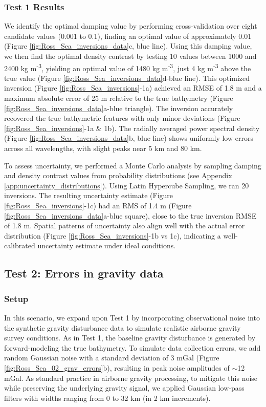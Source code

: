 \documentclass[tc, manuscript]{copernicus}
\begin{document}
\subsubsection{Test 1 Results}
We identify the optimal damping value by performing cross-validation over eight candidate values (0.001 to 0.1), finding an optimal value of approximately 0.01 (Figure \ref{fig:Ross_Sea_inversions_data}c, blue line). Using this damping value, we then find the optimal density contrast by testing 10 values between 1000 and 2400 kg m\textsuperscript{-3}, yielding an optimal value of 1480 kg m\textsuperscript{-3}, just 4 kg m\textsuperscript{-3} above the true value (Figure \ref{fig:Ross_Sea_inversions_data}d-blue line). This optimized inversion (Figure \ref{fig:Ross_Sea_inversions}-1a) achieved an RMSE of 1.8 m and a maximum absolute error of 25 m relative to the true bathymetry (Figure \ref{fig:Ross_Sea_inversions_data}a-blue triangle). The inversion accurately recovered the true bathymetric features with only minor deviations (Figure \ref{fig:Ross_Sea_inversions}-1a \& 1b). The radially averaged power spectral density (Figure \ref{fig:Ross_Sea_inversions_data}b, blue line) shows uniformly low errors across all wavelengths, with slight peaks near 5 km and 80 km.

To assess uncertainty, we performed a Monte Carlo analysis by sampling damping and density contrast values from probability distributions (see Appendix \ref{app:uncertainty_distributions}). Using Latin Hypercube Sampling, we ran 20 inversions. The resulting uncertainty estimate (Figure \ref{fig:Ross_Sea_inversions}-1c) had an RMS of 1.4 m (Figure \ref{fig:Ross_Sea_inversions_data}a-blue square), close to the true inversion RMSE of 1.8 m. Spatial patterns of uncertainty also align well with the actual error distribution (Figure \ref{fig:Ross_Sea_inversions}-1b vs 1c), indicating a well-calibrated uncertainty estimate under ideal conditions.

\subsection{Test 2: Errors in gravity data}
\subsubsection{Setup}
In this scenario, we expand upon Test 1 by incorporating observational noise into the synthetic gravity disturbance data to simulate realistic airborne gravity survey conditions. As in Test 1, the baseline gravity disturbance is generated by forward-modeling the true bathymetry. To simulate data collection errors, we add random Gaussian noise with a standard deviation of 3 mGal (Figure \ref{fig:Ross_Sea_02_grav_errors}b), resulting in peak noise amplitudes of $\sim$12 mGal. As standard practice in airborne gravity processing, to mitigate this noise while preserving the underlying gravity signal, we applied Gaussian low-pass filters with widths ranging from 0 to 32 km (in 2 km increments).
\end{document}
